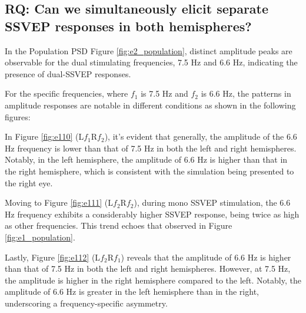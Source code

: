 \subsection{RQ: Can we simultaneously elicit separate SSVEP responses in both hemispheres?}


In the Population PSD Figure \ref{fig:e2_population}, distinct amplitude peaks are observable for the dual stimulating frequencies, 7.5 Hz and 6.6 Hz, indicating the presence of dual-SSVEP responses.

For the specific frequencies, where $f_{1}$ is 7.5 Hz and $f_{2}$ is 6.6 Hz, the patterns in amplitude responses are notable in different conditions as shown in the following figures:

In Figure \ref{fig:e110} (L$f_{1}$R$f_{2}$), it's evident that generally, the amplitude of the 6.6 Hz frequency is lower than that of 7.5 Hz in both the left and right hemispheres. Notably, in the left hemisphere, the amplitude of 6.6 Hz is higher than that in the right hemisphere, which is consistent with the simulation being presented to the right eye.

Moving to Figure \ref{fig:e111} (L$f_{2}$R$f_{2}$), during mono SSVEP stimulation, the 6.6 Hz frequency exhibits a considerably higher SSVEP response, being twice as high as other frequencies. This trend echoes that observed in Figure \ref{fig:e1_population}.

Lastly, Figure \ref{fig:e112} (L$f_{2}$R$f_{1}$) reveals that the amplitude of 6.6 Hz is higher than that of 7.5 Hz in both the left and right hemispheres. However, at 7.5 Hz, the amplitude is higher in the right hemisphere compared to the left. Notably, the amplitude of 6.6 Hz is greater in the left hemisphere than in the right, underscoring a frequency-specific asymmetry.


